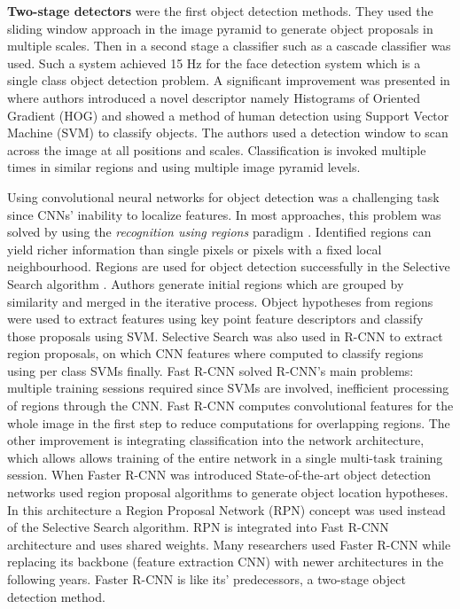 \documentclass{article}
\begin{document}
\textbf{Two-stage detectors} were the first object detection methods.
They used the sliding window approach in the image pyramid to generate object proposals in multiple scales.
Then in a second stage a classifier such as a cascade classifier \cite{viola2001rapid} was used.
Such a system achieved 15 Hz for the face detection system which is a single class object detection problem.
A significant improvement was presented in \cite{dalal2005histograms} where authors introduced a novel descriptor namely Histograms of Oriented Gradient (HOG) and showed a method of human detection using Support Vector Machine (SVM) to classify objects.
The authors used a detection window to scan across the image at all positions and scales.
Classification is invoked multiple times in similar regions and using multiple image pyramid levels.

Using convolutional neural networks for object detection was a challenging task since CNNs' inability to localize features.
In most approaches, this problem was solved by using the \textit{recognition using regions} paradigm \cite{gu2009recognition}.
Identified regions can yield richer information than single pixels or pixels with a fixed local neighbourhood.
Regions are used for object detection successfully in the Selective Search algorithm \cite{uijlings2013selective}.
Authors generate initial regions which are grouped by similarity and merged in the iterative process.
Object hypotheses from regions were used to extract features using key point feature descriptors and classify those proposals using SVM.
Selective Search was also used in R-CNN \cite{girshick2014rich} to extract region proposals, on which CNN features where computed to classify regions using per class SVMs finally.
Fast R-CNN \cite{girshick2015fast} solved R-CNN's main problems: multiple training sessions required since SVMs are involved, inefficient processing of regions through the CNN.
Fast R-CNN computes convolutional features for the whole image in the first step to reduce computations for overlapping regions.
The other improvement is integrating classification  into the network architecture, which allows allows training of the entire
network in a single multi-task training session.
When Faster R-CNN \cite{ren2015faster} was introduced State-of-the-art object detection networks used region proposal algorithms to generate object location hypotheses.
In this architecture a Region Proposal Network (RPN) concept was  used instead of the Selective Search algorithm.
RPN is integrated into Fast R-CNN architecture and uses shared weights.
Many researchers used Faster R-CNN while replacing its backbone (feature extraction CNN) with newer architectures in the following years. Faster R-CNN is like its' predecessors, a two-stage object detection method.
\end{document}
